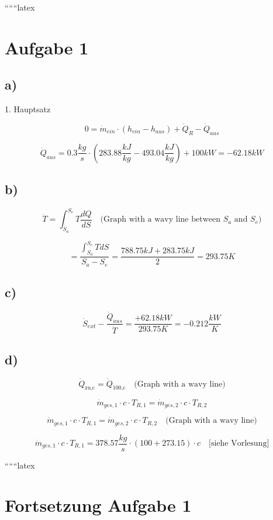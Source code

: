 
``````latex


\section*{Aufgabe 1}

\subsection*{a)}
1. Hauptsatz

\[
0 = \dot{m}_{ein} \cdot (h_{ein} - h_{aus}) + \dot{Q}_R - \dot{Q}_{aus}
\]

\[
\dot{Q}_{aus} = 0.3 \frac{kg}{s} \cdot \left( 283.88 \frac{kJ}{kg} - 493.04 \frac{kJ}{kg} \right) + 100 kW = -62.18 kW
\]

\subsection*{b)}
\[
\dot{T} = \int_{S_a}^{S_e} T \frac{dQ}{dS} \quad \text{(Graph with a wavy line between $S_a$ and $S_e$)}
\]

\[
= \frac{\int_{S_a}^{S_e} T dS}{S_a - S_e} = \frac{788.75 kJ + 283.75 kJ}{2} = 293.75 K
\]

\subsection*{c)}
\[
\dot{S}_{ext} - \frac{\dot{Q}_{aus}}{\dot{T}} = \frac{+62.18 kW}{293.75 K} = -0.212 \frac{kW}{K}
\]

\subsection*{d)}
\[
\dot{Q}_{\text{zu,c}} = \dot{Q}_{\text{100,c}} \quad \text{(Graph with a wavy line)}
\]

\[
\dot{m}_{ges,1} \cdot c \cdot T_{R,1} = \dot{m}_{ges,2} \cdot c \cdot T_{R,2}
\]

\[
\dot{m}_{ges,1} \cdot c \cdot T_{R,1} = \dot{m}_{ges,2} \cdot c \cdot T_{R,2} \quad \text{(Graph with a wavy line)}
\]

\[
\dot{m}_{ges,1} \cdot c \cdot T_{R,1} = 378.57 \frac{kg}{s} \cdot (100 + 273.15) \cdot c \quad \text{[siehe Vorlesung]}
\]

``````latex


\section*{Fortsetzung Aufgabe 1}

